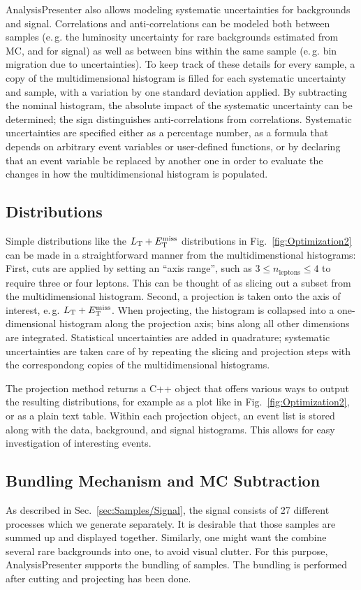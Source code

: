 AnalysisPresenter also allows modeling systematic uncertainties for backgrounds and signal. Correlations and anti-correlations can be modeled both between samples (e.\,g. the luminosity uncertainty for rare backgrounds estimated from MC, and for signal) as well as between bins within the same sample (e.\,g. bin migration due to \MET uncertainties). To keep track of these details for every sample, a copy of the multidimensional histogram is filled for each systematic uncertainty and sample, with a variation by one standard deviation applied. By subtracting the nominal histogram, the absolute impact of the systematic uncertainty can be determined; the sign distinguishes anti-correlations from correlations. Systematic uncertainties are specified either as a percentage number, as a formula that depends on arbitrary event variables or user-defined functions, or by declaring that an event variable be replaced by another one in order to evaluate the changes in how the multidimensional histogram is populated.

\subsection{Distributions}
Simple distributions like the $L_\textrm{T} + E_{\mathrm{T}}^{\text{miss}}$ distributions in Fig.~\ref{fig:Optimization2} can be made in a straightforward manner from the multidimenstional histograms: First, cuts are applied by setting an ``axis range'', such as $3 \leq n_\textrm{leptons} \leq 4$ to require three or four leptons. This can be thought of as slicing out a subset from the multidimensional histogram. Second, a projection is taken onto the axis of interest, e.\,g. $L_\textrm{T} + E_{\mathrm{T}}^{\text{miss}}$. When projecting, the histogram is collapsed into a one-dimensional histogram along the projection axis; bins along all other dimensions are integrated. Statistical uncertainties are added in quadrature; systematic uncertainties are taken care of by repeating the slicing and projection steps with the correspondong copies of the multidimensional histograms.

The projection method returns a C++ object that offers various ways to output the resulting distributions, for example as a plot like in Fig.~\ref{fig:Optimization2}, or as a plain text table. Within each projection object, an event list is stored along with the data, background, and signal histograms. This allows for easy investigation of interesting events.

\subsection{Bundling Mechanism and MC Subtraction}
As described in Sec.~\ref{sec:Samples/Signal}, the signal consists of 27 different processes which we generate separately. It is desirable that those samples are summed up and displayed together. Similarly, one might want the combine several rare backgrounds into one, to avoid visual clutter. For this purpose, AnalysisPresenter supports the bundling of samples. The bundling is performed after cutting and projecting has been done.

